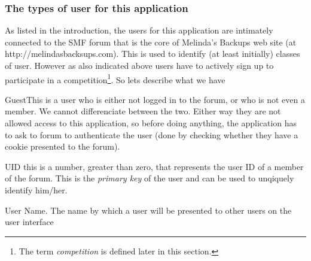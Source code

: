 \documentclass{czen}
\begin{document}
\subsubsection{The types of user for this application}
As listed in the introduction, the users for this application are intimately connected to the SMF forum that is the core of Melinda's Backups web site (at http://melindasbacksups.com).  This is used to identify (at least initially) classes of user.  However as also indicated above users have to actively sign up to participate in a competition\footnote{The term \emph{competition} is defined later in this section.}.  So lets describe what we have
\begin{description}
\item{Guest}This is a user who is either not logged in to the forum, or who is not even a member.  We cannot differenciate between the two.  Either way they are not allowed access to this application, so before doing anything, the application has to ask to forum to authenticate the user (done by checking whether they have a cookie presented to the forum).
\item{UID} this is a number, greater than zero, that represents the user ID of a member of the forum.  This is the \emph{primary key} of the user and can be used to unqiquely identify him/her.
\item{User Name}.  The name by which a user will be presented to other users on the user interface
\end{description}
\end{document}
